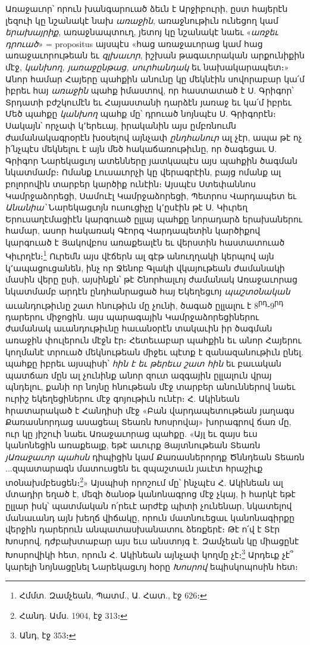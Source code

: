 \documentclass{article}
\begin{document}
{Առաջաւոր՝ որուն խանգարուած ձեւն է Արջիբուրի, ըստ հայերէն լեզուի կը նշանակէ նախ \emph{առաջին}, առաջնութիւն ունեցող կամ \emph{երախայրիք}, առաջնապտուղ, յետոյ կը նշանակէ նաեւ «\emph{առջեւ դրուած}» = propositus այսպէս «հաց առաջաւորաց կամ հաց առաջաւորութեան եւ \emph{զլխաւոր}, իշխան թագաւորական արքունիքին մէջ, \emph{կանխող, յառաջընթաց, սուրհանդակ} եւ նախակարապետ։» Անոր համար Հայերը պահքին անունը կը մեկնէին սովորաբար կա՛մ իբրեւ հայ \emph{առաջին} պահք իմաստով, որ հաստատած է Ս. Գրիգոր՝ Տրդատի բժշկումէն եւ Հայաստանի դարձէն յառաջ եւ կա՛մ իբրեւ Մեծ պահքը \emph{կանխող} պահք մը՝ դրուած նոյնպէս Ս. Գրիգորէն։ Սակայն՝ որչափ կ՚երեւայ, իրականին այս ըմբռնումն ժամանակագրօրէն խօսելով այնչափ \emph{ընդհանուր} ալ չէր, ապա թէ ոչ ի՛նչպէս մեկնելու է այն մեծ հակաճառութիւնը, որ ծագեցաւ Ս. Գրիգոր Նարեկացւոյ ատենները յատկապէս այս պահքին ծագման նկատմամբ։ Ոմանք Լուսաւորչի կը վերագրէին, բայց ոմանք ալ բոլորովին տարբեր կարծիք ունէին։ Այսպէս Ստեփաննոս Կամրջաձորեցի, Սամուէլ Կամրջաձորեցի, Պետրոս Վարդապետ եւ \emph{Անանիա՝} Նարեկացւոյն ուսուցիչը կ՚ըսէին թէ Ս. Կիւրեղ Երուսաղէմացիէն կարգուած ըլլայ պահքը նորադարձ երախաներու համար, ասոր հակառակ Գէորգ Վարդապետին կարծիքով կարգուած է Յակովբոս առաքեալէն եւ վերստին հաստատուած Կիւրղէն։\footnote{Հմմտ. Զամչեան, Պատմ., Ա. Հատ., էջ 626։} Ուրեմն այս վէճերն ալ գէթ անուղղակի կերպով այն կ՚ապացուցանեն, ինչ որ Ջենոբ Գլակի վկայութեան ժամանակի մասին վերը ըսի, այսինքն՝ թէ Շնորհալւոյ ժամանակ Առաջաւորաց նկատմամբ արդէն ընդհանրացած հայ Եկեղեցւոյ \emph{պաշտօնական} աւանդութիւնը շատ հնութիւն մը չունի, ծագած ըլլալու է 8\textsuperscript{րդ}֊9\textsuperscript{րդ} դարերու միջոցին. այս պարագային Կամրջաձորեցիներու ժամանակ աւանդութիւնը հաւանօրէն տակաւին իր ծագման առաջին փուլերուն մէջն էր։ Հետեւաբար պահքին եւ անոր Հայերու կողմանէ տրուած մեկնութեան միջեւ պէտք է զանազանութիւն ընել. պահքը իբրեւ այսպիսի՝ \emph{հին է եւ թերեւս շատ հին} եւ բաւական պատճառ մըն ալ չունինք անոր զուտ ազգային ըլլալուն վրայ պնդելու, քանի որ նոյնը հնութեան մէջ տարբեր անուններով նաեւ ուրիշ եկեղեցիներու մէջ գոյութիւն ունէր։ Հ. Ակինեան հրատարակած է Հանդիսի մէջ «Բան վարդապետութեան յաղագս Քառասնորդաց ասացեալ Տեառն Խոսրովայ» խորագրով ճառ մը, ուր կը յիշուի նաեւ Առաջաւորաց պահքը. «Այլ եւ զայս եւս կանոնեցին առաքեալք, եթէ աւուրք Յայտնութեան Տեառն \emph{յԱռաջաւոր պահսն} դիպիցին կամ Քառասներորդք Ծննդեան Տեառն ...զպատարագն մատուսցեն եւ զպաշտաւն յաւէտ հրաշիւք տօնախմբեսցեն։\footnote{Հանդ. Ամս. 1904, էջ 313։}» Այսպիսի որոշում մը՝ ինչպէս Հ. Ակինեան ալ մտադիր եղած է, մեզի ծանօթ կանոնագրոց մէջ չկայ, ի հարկէ եթէ ըլլար իսկ՝ պատմական ո՛րեւէ արժէք պիտի չունենար, նկատելով մանաւանդ այն խեղճ վիճակը, որուն մատնուեցաւ կանոնագիրքը վերջին դարերուն անպատասխանատու ձեռքերէ։ Թէ ո՛վ է Տէր Խոսրով, դժբախտաբար այս եւս անստոյգ է. Զամչեան կը միացընէ Խոսրովիկի հետ, որուն Հ. Ակինեան այնչափ կողմը չէ։\footnote{Անդ, էջ 353։} Արդեւք չէ՞ կարելի նոյնացընել Նարեկացւոյ հօրը \emph{Խոսրով} եպիսկոպոսին հետ։

}
\end{document}
